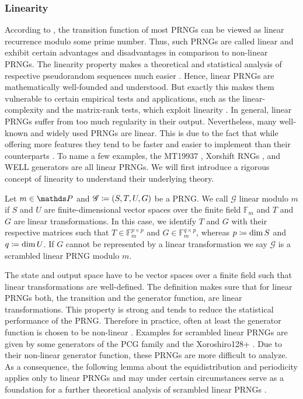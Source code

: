 \documentclass{stdlocal}
\begin{document}
  \subsubsection{Linearity}
  According to \textcite{lecuyer2015}, the transition function of most PRNGs can be viewed as linear recurrence modulo some prime number.
  Thus, such PRNGs are called linear and exhibit certain advantages and disadvantages in comparison to non-linear PRNGs.
  The linearity property makes a theoretical and statistical analysis of respective pseudorandom sequences much easier \autocite{lecuyer2015,blackman2019,bauke2007}.
  Hence, linear PRNGs are mathematically well-founded and understood.
  But exactly this makes them vulnerable to certain empirical tests and applications, such as the linear-complexity and the matrix-rank tests, which exploit linearity \autocite{lecuyer2015,oneill2014,lemire2019}.
  In general, linear PRNGs suffer from too much regularity in their output.
  Nevertheless, many well-known and widely used PRNGs are linear.
  This is due to the fact that while offering more features they tend to be faster and easier to implement than their counterparts \autocite{lecuyer2015,blackman2019}.
  To name a few examples, the MT19937 \autocite{matsumoto1998}, Xorshift RNGs \autocite{marsaglia2003,vigna2016,vigna2017}, and WELL generators \autocite{panneton2006} are all linear PRNGs.
  We will first introduce a rigorous concept of linearity to understand their underlying theory.

  \begin{definition}
    Let $m\in\setPrime$ and $\mathscr{G}\coloneqq(S,T,U,G)$ be a PRNG.
    We call $\mathscr{G}$ linear modulo $m$ if $S$ and $U$ are finite-dimensional vector spaces over the finite field $\mathds{F}_m$ and $T$ and $G$ are linear transformations.
    In this case, we identify $T$ and $G$ with their respective matrices such that $T \in \mathds{F}_m^{p\times p}$ and $G \in \mathds{F}_m^{q\times p}$, whereas $p\coloneqq\dim S$ and $q\coloneqq\dim U$.
    If $G$ cannot be represented by a linear transformation we say $\mathscr{G}$ is a scrambled linear PRNG modulo $m$.
  \end{definition}
  The state and output space have to be vector spaces over a finite field such that linear transformations are well-defined.
  The definition makes sure that for linear PRNGs both, the transition and the generator function, are linear transformations.
  This property is strong and tends to reduce the statistical performance of the PRNG.
  Therefore in practice, often at least the generator function is chosen to be non-linear \autocite{blackman2019}.
  Examples for scrambled linear PRNGs are given by some generators of the PCG family \autocite{oneill2014} and the Xoroshiro128+ \autocite{blackman2019}.
  Due to their non-linear generator function, these PRNGs are more difficult to analyze.
  As a consequence, the following lemma about the equidistribution and periodicity applies only to linear PRNGs and may under certain circumstances serve as a foundation for a further theoretical analysis of scrambled linear PRNGs \autocite{lecuyer2015,bauke2007}.
\end{document}
